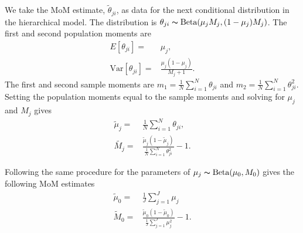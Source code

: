 \documentclass[11pt,reqno]{amsart}
\begin{document}
We take the MoM estimate, $\tilde{\theta}_{ji}$, as data for the next conditional distribution in the hierarchical model. The distribution is $\theta_{ji} \thicksim \text{Beta}(\mu_jM_j, (1-\mu_j)M_j)$. The first and second population moments are
\begin{eqnarray}
	E[\theta_{ji}] =& \mu_j,\\
	\text{Var}[\theta_{ji}] =& \frac{\mu_j(1-\mu_j)} { M_j + 1 }.
\end{eqnarray}
The first and second sample moments are $m_1 = \frac{1}{N}\sum_{i=1}^N \theta_{ji}$ and $m_2 = \frac{1}{N}\sum_{i=1}^N \theta_{ji}^2$. Setting the population moments equal to the sample moments and solving for $\mu_j$ and $M_j$ gives
\begin{eqnarray}
	\tilde{\mu}_j =& \frac{1}{N} \sum_{i=1}^N \theta_{ji}, \\
	\tilde{M_j} =& \frac{ \tilde{\mu}_j (1 - \tilde{\mu}_j ) } { \frac{1}{N} \sum_{i=1}^N \theta_{ji}^2 } -1.
\end{eqnarray}

Following the same procedure for the parameters of $\mu_j \thicksim \text{Beta}(\mu_0, M_0)$ gives the following MoM estimates
\begin{eqnarray}
	\tilde{\mu}_0 =& \frac{1}{J} \sum_{j=1}^J \mu_j \\
	\tilde{M}_0 =& \frac{ \tilde{\mu}_0 (1 - \tilde{\mu}_0 ) } {\frac{1}{J} \sum_{j=1}^J \mu_j^2 } -1.
\end{eqnarray}



\end{document}
